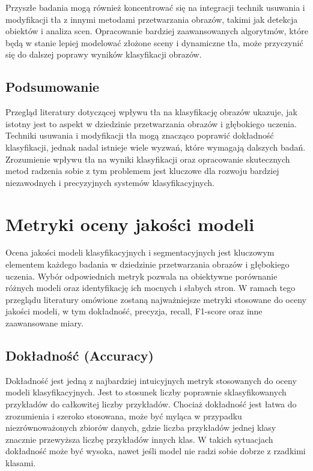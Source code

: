 Przyszłe badania mogą również koncentrować się na integracji technik usuwania i modyfikacji tła z 
innymi metodami przetwarzania obrazów, takimi jak detekcja obiektów i analiza scen. Opracowanie 
bardziej zaawansowanych algorytmów, które będą w stanie lepiej modelować złożone sceny i dynamiczne 
tła, może przyczynić się do dalszej poprawy wyników klasyfikacji obrazów.

\subsection*{Podsumowanie}

Przegląd literatury dotyczącej wpływu tła na klasyfikację obrazów ukazuje, jak istotny jest to 
aspekt w dziedzinie przetwarzania obrazów i głębokiego uczenia. Techniki usuwania i modyfikacji 
tła mogą znacząco poprawić dokładność klasyfikacji, jednak nadal istnieje wiele wyzwań, które 
wymagają dalszych badań. Zrozumienie wpływu tła na wyniki klasyfikacji oraz opracowanie skutecznych 
metod radzenia sobie z tym problemem jest kluczowe dla rozwoju bardziej niezawodnych i precyzyjnych 
systemów klasyfikacyjnych.

\section*{Metryki oceny jakości modeli}

Ocena jakości modeli klasyfikacyjnych i segmentacyjnych jest kluczowym elementem każdego badania w 
dziedzinie przetwarzania obrazów i głębokiego uczenia. Wybór odpowiednich metryk pozwala na obiektywne 
porównanie różnych modeli oraz identyfikację ich mocnych i słabych stron. W ramach tego przeglądu 
literatury omówione zostaną najważniejsze metryki stosowane do oceny jakości modeli, w tym dokładność, 
precyzja, recall, F1-score oraz inne zaawansowane miary.

\subsection*{Dokładność (Accuracy)}

Dokładność jest jedną z najbardziej intuicyjnych metryk stosowanych do oceny modeli klasyfikacyjnych. 
Jest to stosunek liczby poprawnie sklasyfikowanych przykładów do całkowitej liczby przykładów. 
Chociaż dokładność jest łatwa do zrozumienia i szeroko stosowana, może być myląca w przypadku 
niezrównoważonych zbiorów danych, gdzie liczba przykładów jednej klasy znacznie przewyższa liczbę 
przykładów innych klas. W takich sytuacjach dokładność może być wysoka, nawet jeśli model nie radzi 
sobie dobrze z rzadkimi klasami.


